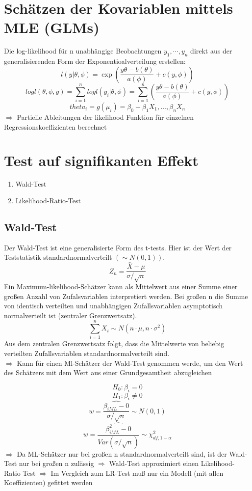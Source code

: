 
\section{Schätzen der Kovariablen mittels MLE (GLMs)}
Die log-likelihood für n unabhängige Beobachtungen $y_1,\cdots,y_n$ direkt aus der generalisierenden Form der Exponentioalverteilung erstellen:
\[ l(y|\theta, \phi) = \exp \left( \frac{y \theta - b(\theta)}{a(\phi)} + c(y,\phi) \right) \]
\[ log l (\theta, \phi, y) = \sum\limits_{i=1}^{n} log l (y_i | \theta, \phi) = \sum\limits_{i=1}^{n} \left( \frac{y \theta - b(\theta)}{a(\phi)} + c(y,\phi) \right) \]
\[theta_i = g(\mu_i)=\beta_0 + \beta_1 X_1,\dots,\beta_n X_n \]
$\Rightarrow$ Partielle Ableitungen der likelihood Funktion für einzelnen Regressionskoeffizienten berechnet
\section{Test auf signifikanten Effekt}
\begin{enumerate}
	\item Wald-Test
	\item Likelihood-Ratio-Test
\end{enumerate}

\subsection{Wald-Test}
Der Wald-Test ist eine generalisierte Form des t-tests. Hier ist der Wert der Teststatistik standardnormalverteilt $(\sim N(0,1))$.
\[Z_n = \frac{\bar{X} - \mu}{\sigma / \sqrt{n}} \]
Ein Maximum-likelihood-Schätzer kann als Mittelwert aus einer Summe einer großen Anzahl von Zufalsvariablen interpretiert werden.
Bei großen n die Summe von identisch verteilten und unabhängigen Zufallsvariablen asymptotisch normalverteilt ist (zentraler Grenzwertsatz).
\[\sum\limits_{i=1}^{n} X_i \sim N(n \cdot \mu, n \cdot \sigma^{2}) \]
Aus dem zentralen Grenzwertsatz folgt, dass die Mittelwerte von beliebig verteilten Zufallsvariablen standardnormalverteilt sind. \\
$\Rightarrow$ Kann für einen Ml-Schätzer der Wald-Test genommen werde, um den Wert des Schätzers mit dem Wert aus einer Grundgesamtheit abzugleichen

\[ H_0: \beta_i = 0 \]
\[ H_1: \beta_i \neq 0 \]
\[ w = \frac{\hat{\beta_{iML}-0}}{\sigma / \sqrt{n}} \sim N(0,1) \]
\[ w = \frac{\hat{\beta_{iML}^{2}-0}}{Var(\sigma / \sqrt{n})} \sim \chi_{df,1-\alpha}^{2} \]
$\Rightarrow$ Da ML-Schätzer nur bei großen n standardnormalverteilt sind, ist der Wald-Test nur bei großen n zulässig
$\Rightarrow$ Wald-Test approximiert einen Likelihood-Ratio Test
$\Rightarrow$ Im Vergleich zum LR-Test muß nur ein Modell (mit allen Koeffizienten) gefittet werden
